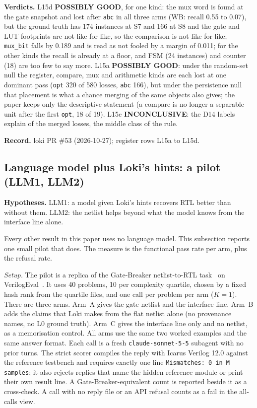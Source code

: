 \documentclass[conference]{IEEEtran}
\newcommand{\verdict}[1]{\textbf{\textsc{#1}}}
\newcommand{\hev}[1]{\par\smallskip\noindent\textbf{#1}}
\newcommand{\code}[1]{\texttt{#1}}
\begin{document}
\hev{Verdicts.} L15d \verdict{POSSIBLY GOOD}, for one kind: the mux word is found at the gate snapshot and lost after \code{abc} in
all three arms (WB: recall 0.55 to 0.07), but the ground truth has 174 instances at S7 and 166 at S8 and the gate and LUT
footprints are not like for like, so the comparison is not like for like; \code{mux\_bit} falls by 0.189 and is read as not
fooled by a margin of 0.011; for the other kinds the recall is already at a floor, and FSM (24 instances) and counter (18)
are too few to say more. L15a \verdict{POSSIBLY GOOD}: under the random-set null the register,
compare, mux and arithmetic kinds are each lost at one dominant pass (\code{opt} 320 of 580 losses, \code{abc} 166), but under the
persistence null that placement is what a chance merging of the same objects also gives; the paper keeps only the descriptive
statement (a compare is no longer a separable unit after the first \code{opt}, 18 of 19). L15c \verdict{INCONCLUSIVE}: the D14
labels explain \rsxExplainedShare{} of the merged losses, the middle class of the rule.


\hev{Record.} loki PR \#53 (2026-10-27); register rows L15a to L15d.

\subsection{Language model plus Loki's hints: a pilot (LLM1, LLM2)}
\label{sec:llm-pilot}

\hev{Hypotheses.} LLM1: a model given Loki's hints recovers RTL better than without them. LLM2: the netlist helps
beyond what the model knows from the interface line alone.



Every other result in this paper uses no language model. This subsection reports one small pilot
that does. The measure is the functional pass rate per arm, plus the refusal rate.

\emph{Setup.} The pilot is a replica of the Gate-Breaker netlist-to-RTL task~\cite{faruque2025gatebreaker}
on VerilogEval~\cite{liu2023verilogeval}. It uses 40 problems, 10 per complexity quartile,
chosen by a fixed hash rank from the quartile files, and one call per problem per arm ($K=1$).
There are three arms. Arm~A gives the gate netlist and the interface line. Arm~B adds the claims
that Loki makes from the flat netlist alone (no provenance names, no L0 ground truth). Arm~C gives
the interface line only and no netlist, as a memorisation control. All arms use the same two
worked examples and the same answer format. Each call is a fresh \code{claude-sonnet-5-5}
subagent with no prior turns. The strict scorer compiles the reply with Icarus Verilog 12.0 against
the reference testbench and requires exactly one line \code{Mismatches: 0 in M samples}; it also
rejects replies that name the hidden reference module or print their own result line. A
Gate-Breaker-equivalent count is reported beside it as a cross-check. A call with no reply file or
an API refusal counts as a fail in the all-calls view.
\end{document}
